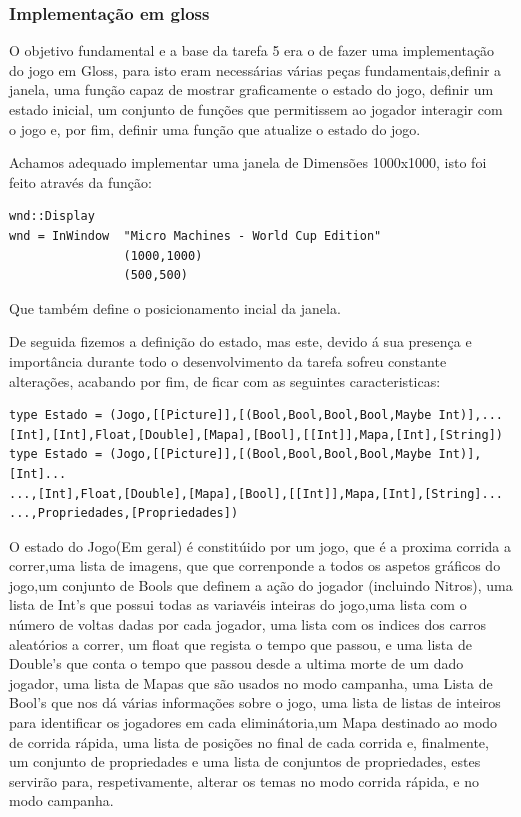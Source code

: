 \documentclass[a4paper]{report} %
\begin{document}
\subsubsection{Implementação em gloss}
O objetivo fundamental e a base da tarefa 5 era o de fazer uma implementação do jogo em Gloss, para isto eram necessárias várias peças fundamentais,definir a janela, uma função capaz de mostrar graficamente o estado do jogo, definir um estado inicial, um conjunto de funções que permitissem ao jogador interagir com o jogo e, por fim, definir uma função que atualize o estado do jogo.

Achamos adequado implementar uma janela de Dimensões 1000x1000, isto foi feito através da função:
\begin{verbatim}
wnd::Display
wnd = InWindow  "Micro Machines - World Cup Edition"
                (1000,1000)
                (500,500)
\end{verbatim}
Que também define o posicionamento incial da janela.

De seguida fizemos a definição do estado, mas este, devido á sua presença e importância durante todo o desenvolvimento da tarefa sofreu constante alterações, acabando por fim, de ficar com as seguintes caracteristicas:
\begin{verbatim}
type Estado = (Jogo,[[Picture]],[(Bool,Bool,Bool,Bool,Maybe Int)],...
[Int],[Int],Float,[Double],[Mapa],[Bool],[[Int]],Mapa,[Int],[String])
type Estado = (Jogo,[[Picture]],[(Bool,Bool,Bool,Bool,Maybe Int)],[Int]...
...,[Int],Float,[Double],[Mapa],[Bool],[[Int]],Mapa,[Int],[String]...
...,Propriedades,[Propriedades])
\end{verbatim}

O estado do Jogo(Em geral) é constitúido por um jogo, que é a proxima corrida a correr,uma lista de imagens, que que correnponde a todos os aspetos gráficos do jogo,um conjunto de Bools que definem a ação do jogador (incluindo Nitros), uma lista de Int's que possui todas as variavéis inteiras do jogo,uma lista com o número de voltas dadas por cada jogador, uma lista com os indices dos carros aleatórios a correr, um float que regista o tempo que passou, e uma lista de Double's que conta o tempo que passou desde a ultima morte de um dado jogador, uma lista de Mapas que são usados no modo campanha, uma Lista de Bool's que nos dá várias informações sobre o jogo, uma lista de listas de inteiros para identificar os jogadores em cada eliminátoria,um Mapa destinado ao modo de corrida rápida, uma lista de posições no final de cada corrida e, finalmente, um conjunto de propriedades e uma lista de conjuntos de propriedades, estes servirão para, respetivamente, alterar os temas no modo corrida rápida, e no modo campanha.
\end{document}
